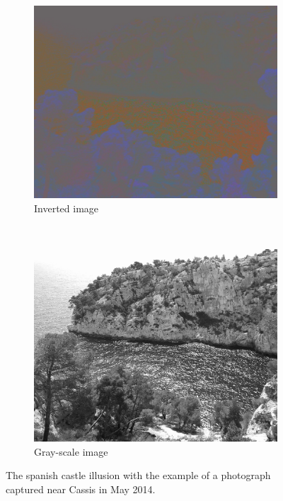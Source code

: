 \documentclass[a4paper]{article}
\begin{document}
\begin{figure}[H]
	\vspace{3mm}
	\begin{subfigure}[h]{0.48\textwidth}
		\centering
		\includegraphics[width=\textwidth]{calanque_inv}
		\caption*{Inverted image}
	\end{subfigure}
	~
	\begin{subfigure}[h]{0.48\textwidth}
		\centering
		\includegraphics[width=\textwidth]{calanque_gray}
		\caption*{Gray-scale image}
	\end{subfigure}	
\caption{The spanish castle illusion with the example of a photograph captured near Cassis in May 2014.}
\label{fig:calanque}
\end{figure}
\end{document}
